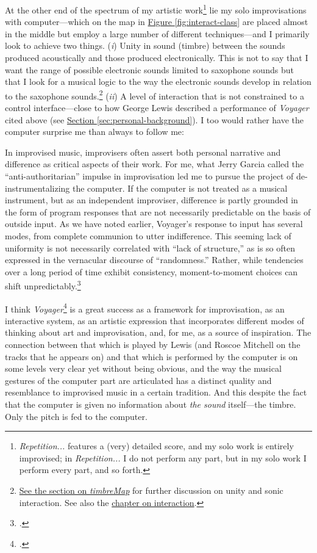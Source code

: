 At the other end of the spectrum of my artistic work\footnote{\emph{Repetition...} features a (very) detailed score, and my solo work is entirely improvised; in \emph{Repetition...} I do not perform any part, but in my solo work I perform every part, and so forth.} lie my solo improvisations with computer---which on the map in \hyperref[fig:interact-class]{Figure \ref*{fig:interact-class}} are placed almost in the middle but employ a large number of different techniques---and I primarily look to achieve two things. (\textit{i}) Unity in sound (timbre) between the sounds produced acoustically and those produced electronically. This is not to say that I want the range of possible electronic sounds limited to saxophone sounds but that I look for a musical logic to the way the electronic sounds develop in relation to the saxophone sounds.\footnote{\hyperref[sec:timbremap]{See the section on \emph{timbreMap}} for further discussion on unity and sonic interaction. See also the \hyperref[sec:interraction-self]{chapter on interaction}.} (\textit{ii}) A level of interaction that is not constrained to a control interface---close to how George Lewis described a performance of \emph{Voyager} cited above (see \hyperlink{sec:target:personal-background-1}{Section \ref*{sec:personal-background}}). I too would rather have the computer surprise me than always to follow me:

\begin{squote}
In improvised music, improvisers often assert both personal narrative and difference as critical aspects of their work. For me, what Jerry Garcia called the ``anti-authoritarian'' impulse in improvisation led me to pursue the project of de-instrumentalizing the computer. If the computer is not treated as a musical instrument, but as an independent improviser, difference is partly grounded in the form of program responses that are not necessarily predictable on the basis of outside input. As we have noted earlier, Voyager's response to input has several modes, from complete communion to utter indifference. This seeming lack of uniformity is not necessarily correlated with ``lack of structure,'' as is so often expressed in the vernacular discourse of ``randomness.'' Rather, while tendencies over a long period of time exhibit consistency, moment-to-moment choices can shift unpredictably.\footcite[36]{lewis00}
\end{squote}

I think \emph{Voyager}\footcite{lewis92} is a great success as a framework for improvisation, as an interactive system, as an artistic expression that incorporates different modes of thinking about art and improvisation, and, for me, as a source of inspiration. The connection between that which is played by Lewis (and Roscoe Mitchell on the tracks that he appears on) and that which is performed by the computer is on some levels very clear yet without being obvious, and the way the musical gestures of the computer part are articulated has a distinct quality and resemblance to improvised music in a certain tradition. And this despite the fact that the computer is given no information about \emph{the sound} itself---the timbre. Only the pitch is fed to the computer.

